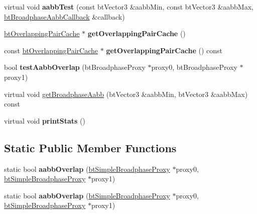 \begin{DoxyCompactItemize}
\item 
\mbox{\label{classbtSimpleBroadphase_a7880ec512b9213893cd2c6e14ec4873f}} 
virtual void {\bfseries aabb\+Test} (const bt\+Vector3 \&aabb\+Min, const bt\+Vector3 \&aabb\+Max, \hyperlink{structbtBroadphaseAabbCallback}{bt\+Broadphase\+Aabb\+Callback} \&callback)
\item 
\mbox{\label{classbtSimpleBroadphase_a66ea1c78dbf926e744716ca547cef831}} 
\hyperlink{classbtOverlappingPairCache}{bt\+Overlapping\+Pair\+Cache} $\ast$ {\bfseries get\+Overlapping\+Pair\+Cache} ()
\item 
\mbox{\label{classbtSimpleBroadphase_a21d44393fa6596f039ab04de47e43d6d}} 
const \hyperlink{classbtOverlappingPairCache}{bt\+Overlapping\+Pair\+Cache} $\ast$ {\bfseries get\+Overlapping\+Pair\+Cache} () const
\item 
\mbox{\label{classbtSimpleBroadphase_a377a57ae8d343194a75ac51d4e3c005a}} 
bool {\bfseries test\+Aabb\+Overlap} (bt\+Broadphase\+Proxy $\ast$proxy0, bt\+Broadphase\+Proxy $\ast$proxy1)
\item 
virtual void \hyperlink{classbtSimpleBroadphase_a4e8e5de5df6d3125631e3d94a67ac4d2}{get\+Broadphase\+Aabb} (bt\+Vector3 \&aabb\+Min, bt\+Vector3 \&aabb\+Max) const
\item 
\mbox{\label{classbtSimpleBroadphase_aa2697c7a6883ae3192ea1eeb64ded59c}} 
virtual void {\bfseries print\+Stats} ()
\end{DoxyCompactItemize}
\subsection*{Static Public Member Functions}
\begin{DoxyCompactItemize}
\item 
\mbox{\label{classbtSimpleBroadphase_ade60a3d0ed52b7b4ec41a25d697357fb}} 
static bool {\bfseries aabb\+Overlap} (\hyperlink{structbtSimpleBroadphaseProxy}{bt\+Simple\+Broadphase\+Proxy} $\ast$proxy0, \hyperlink{structbtSimpleBroadphaseProxy}{bt\+Simple\+Broadphase\+Proxy} $\ast$proxy1)
\item 
\mbox{\label{classbtSimpleBroadphase_a020423e3b306a69466cd7772f99cbc3f}} 
static bool {\bfseries aabb\+Overlap} (\hyperlink{structbtSimpleBroadphaseProxy}{bt\+Simple\+Broadphase\+Proxy} $\ast$proxy0, \hyperlink{structbtSimpleBroadphaseProxy}{bt\+Simple\+Broadphase\+Proxy} $\ast$proxy1)
\end{DoxyCompactItemize}
